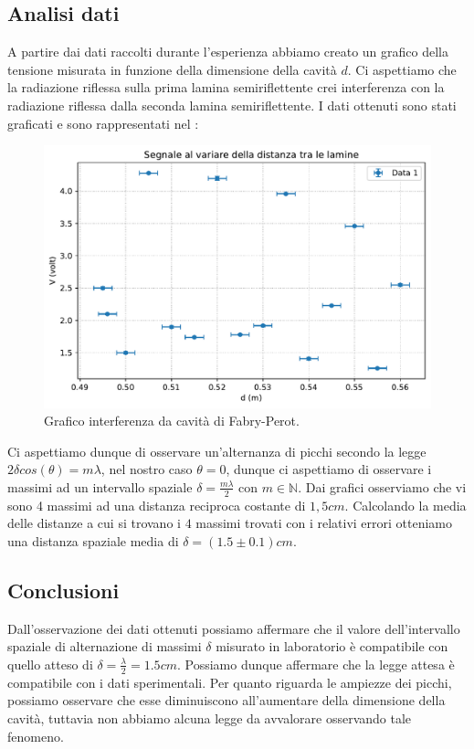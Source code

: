 \documentclass[a4paper]{article}
\begin{document}
\subsection{Analisi dati}
A partire dai dati raccolti durante l'esperienza abbiamo creato un grafico della tensione misurata in funzione della dimensione della cavità $d$. Ci aspettiamo che la radiazione riflessa sulla prima lamina semiriflettente crei interferenza con la radiazione riflessa dalla seconda lamina semiriflettente. I dati ottenuti sono stati graficati e sono rappresentati nel :
\begin{figure}[H]
    \centering
    \includegraphics[width=0.5\linewidth]{grafici/fabriperot.pdf}
    \caption{Grafico interferenza da cavità di Fabry-Perot.}
    \label{fig:grafico_Fabry_Perot}
\end{figure}




Ci aspettiamo dunque di osservare un'alternanza di picchi secondo la legge $2\delta cos(\theta)=m\lambda$, nel nostro caso $\theta=0$, dunque ci aspettiamo di osservare i massimi ad un intervallo spaziale $\delta=\frac{m\lambda}{2}$ con $m\in\mathbb{N}$. Dai grafici osserviamo che vi sono 4 massimi ad una distanza reciproca costante di $1,5cm$. Calcolando la media delle distanze a cui si trovano i $4$ massimi trovati con i relativi errori otteniamo una distanza spaziale media di $\delta=(1.5\pm 0.1)cm$.  


\subsection{Conclusioni}
Dall'osservazione dei dati ottenuti possiamo affermare che il valore dell'intervallo spaziale di alternazione di massimi $\delta$ misurato in laboratorio è compatibile con quello atteso di $\delta=\frac{\lambda}{2}=1.5cm$. Possiamo dunque affermare che la legge attesa è compatibile con i dati sperimentali. Per quanto riguarda le ampiezze dei picchi, possiamo osservare che esse diminuiscono all'aumentare della dimensione della cavità, tuttavia non abbiamo alcuna legge da avvalorare osservando tale fenomeno.
\end{document}
